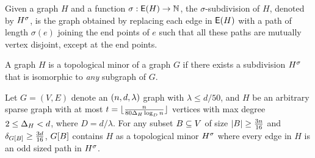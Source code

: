 \documentclass[11pt]{article}
\begin{document}
\begin{definition}\label{def:subdivisions}
Given a graph $H$ and a function $\sigma: \mathsf{E}(H) \rightarrow \mathbb{N}$, the $\sigma$-subdivision of $H$, denoted by ${H}^{\sigma}$, is the graph obtained by replacing each edge in $\mathsf{E}(H)$ with a path of length $\sigma(e)$ joining the end points of $e$ such that all these paths are mutually vertex disjoint, except at the end points.
\end{definition}

\begin{definition}\label{def:topological-minor}
A graph $H$ is a topological minor of a graph $G$ if there exists a subdivision ${H}^{\sigma}$ that is isomorphic to \emph{any} subgraph of $G$.
\end{definition}


\begin{theorem}\label{theorem:embedding-theorem}
  Let $G=(V,E)$ denote an $(n, d, \lambda)$ graph with $\lambda \le d/50$, and $H$ be an arbitrary sparse graph with at most $t = \lfloor \frac{ n}{80\Delta_{H}\log_Dn}\rfloor $ vertices with max degree $ 2 \le \Delta_{H} < d$, where $D=d/\lambda$.
  For any subset $B \subseteq V$ of size $|B| \ge \frac{3n}{16}$ and $\delta_{G[B]} \ge \frac{3d}{16}$, $G[B]$ contains $H$ as a topological minor ${H}^{\sigma}$ where every edge in $H$ is an odd sized path in ${H}^{\sigma}$.
\end{theorem}
\end{document}
